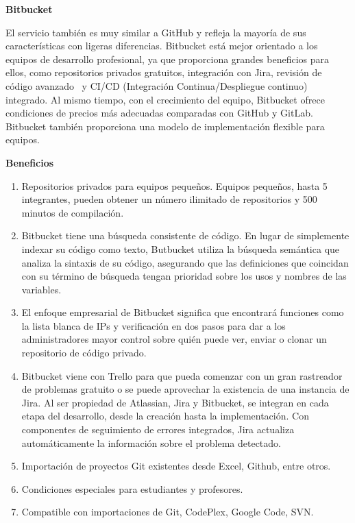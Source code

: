 \documentclass{article} %
\begin{document}
\noindent 

\noindent \textbf{Bitbucket}

\noindent El servicio tambi\'{e}n es muy similar a GitHub y refleja la mayor\'{i}a de sus caracter\'{i}sticas con ligeras diferencias. Bitbucket est\'{a} mejor orientado a los equipos de desarrollo profesional, ya que proporciona grandes beneficios para ellos, como repositorios privados gratuitos, integraci\'{o}n con Jira, revisi\'{o}n de c\'{o}digo avanzado~ y CI/CD (Integraci\'{o}n Continua/Despliegue continuo) integrado. Al mismo tiempo, con el crecimiento del equipo, Bitbucket ofrece condiciones de precios m\'{a}s adecuadas comparadas con GitHub y GitLab. Bitbucket tambi\'{e}n proporciona una modelo de implementaci\'{o}n flexible para equipos.

\noindent \textbf{Beneficios}

\begin{enumerate}
\item \textbf{ }Repositorios privados para equipos peque\~{n}os. Equipos peque\~{n}os, hasta 5 integrantes, pueden obtener un n\'{u}mero ilimitado de repositorios y 500 minutos de compilaci\'{o}n.

\item  Bitbucket tiene una b\'{u}squeda consistente de c\'{o}digo. En lugar de simplemente indexar su c\'{o}digo como texto, Butbucket utiliza la b\'{u}squeda sem\'{a}ntica que analiza la sintaxis de su c\'{o}digo, asegurando que las definiciones que coincidan con su t\'{e}rmino de b\'{u}squeda tengan prioridad sobre los usos y nombres de las variables.

\item  El enfoque empresarial de Bitbucket significa que encontrar\'{a} funciones como la lista blanca de IPs y verificaci\'{o}n en dos pasos para dar a los administradores mayor control sobre qui\'{e}n puede ver, enviar o clonar un repositorio de c\'{o}digo privado.

\item  Bitbucket viene con Trello para que pueda comenzar con un gran rastreador de problemas gratuito o se puede aprovechar la existencia de una instancia de Jira. Al ser propiedad de Atlassian, Jira y Bitbucket, se integran en cada etapa del desarrollo, desde la creaci\'{o}n hasta la implementaci\'{o}n. Con componentes de seguimiento de errores integrados, Jira actualiza autom\'{a}ticamente la informaci\'{o}n sobre el problema detectado.

\item  Importaci\'{o}n de proyectos Git existentes desde Excel, Github, entre otros.

\item  Condiciones especiales para estudiantes y profesores.

\item  Compatible con importaciones de Git, CodePlex, Google Code, SVN.
\end{enumerate}
\end{document}
